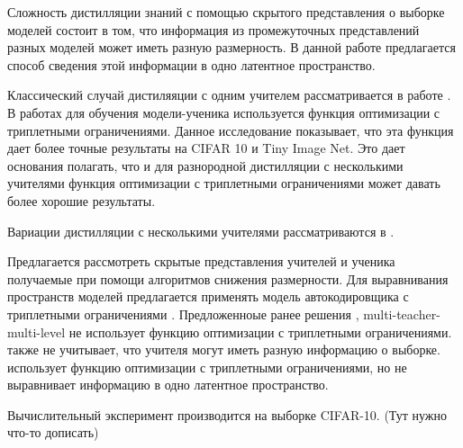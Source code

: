 \documentclass{article}
\begin{document}
Сложность дистилляции знаний с помощью скрытого представления о выборке моделей состоит в том, что информация из промежуточных представлений разных моделей может иметь разную размерность. В данной работе предлагается способ сведения этой информации в одно латентное пространство.

Классический случай дистиляяции с одним учителем рассматривается в работе \citep{hinton}. В работах \citep{tripletloss,tripletloss-face-rec-distill} для обучения модели-ученика используется функция оптимизации с триплетными ограничениями. Данное исследование  показывает, что эта функция дает более точные результаты на CIFAR 10 и Tiny Image Net. Это дает основания полагать, что и для разнородной дистилляции с несколькими учителями функция оптимизации с триплетными ограничениями может давать более хорошие результаты. 

Вариации дистилляции с несколькими учителями рассматриваются в \citep{multi-teacher,multi-teacher-multi-level, adaptive}.  

 Предлагается рассмотреть скрытые представления учителей и ученика получаемые при помощи алгоритмов снижения размерности. Для выравнивания пространств моделей предлагается применять модель автокодировщика с триплетными ограничениями \citep{tripletloss}. Предложенноые ранее решения \cite{multi-teacher}, {multi-teacher-multi-level} не использует функцию оптимизации с триплетными ограничениями. \citep{multi-teacher} также не учитывает, что учителя могут иметь разную информацию о выборке. \citep{tripletloss-face-rec-distill} использует функцию оптимизации с триплетными ограничениями, но
не выравнивает информацию в одно латентное пространство. 

Вычислительный эксперимент производится на выборке CIFAR-10. (Тут нужно что-то дописать)





\label{sec:others}

\nocite{*}
  
\end{document}
